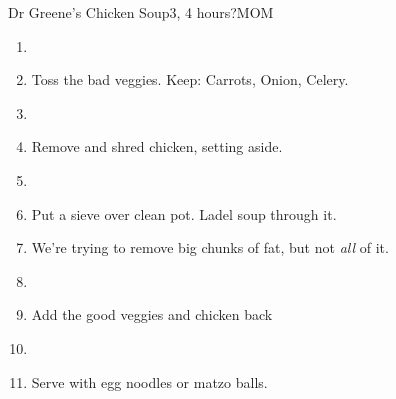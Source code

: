 \documentclass[]{mikescards}
\begin{document}
\begin{recipe}{Dr Greene's Chicken Soup}{3, 4 hours?}{MOM}
\begin{parcolumns}[colwidths={1=100pt}, rulebetween]{2}
{\begin{enumerate}
      \item 
      \item Toss the bad veggies. Keep: Carrots, Onion, Celery.
      \item 
      \item Remove and shred chicken, setting aside.
      \item 
      \item Put a sieve over clean pot. Ladel soup through it. 
      \item \hspace{5mm} We're trying to remove big chunks of fat, but not \textsl{all} of it.
      \item
      \item Add the good veggies and chicken back
      \item
      \item Serve with egg noodles or matzo balls.
    \end{enumerate}
  }
\end{parcolumns}

\end{recipe}
\end{document}
